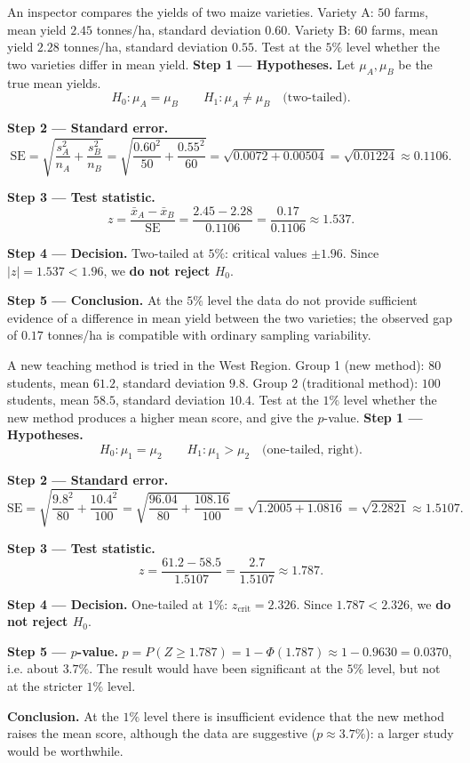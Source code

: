 \documentclass[11pt]{article}
\begin{document}
\begin{exoresolu}
An inspector compares the yields of two maize varieties. Variety A: $50$ farms, mean yield $2.45$ tonnes/ha, standard deviation $0.60$. Variety B: $60$ farms, mean yield $2.28$ tonnes/ha, standard deviation $0.55$. Test at the $5\%$ level whether the two varieties differ in mean yield.
\tcblower
\textbf{Step 1 --- Hypotheses.} Let $\mu_A, \mu_B$ be the true mean yields.
\[ H_0 : \mu_A = \mu_B \qquad H_1 : \mu_A \neq \mu_B \quad \text{(two-tailed)}. \]

\textbf{Step 2 --- Standard error.}
\[ \mathrm{SE} = \sqrt{\frac{s_A^2}{n_A} + \frac{s_B^2}{n_B}} = \sqrt{\frac{0.60^2}{50} + \frac{0.55^2}{60}} = \sqrt{0.0072 + 0.00504} = \sqrt{0.01224} \approx 0.1106. \]

\textbf{Step 3 --- Test statistic.}
\[ z = \frac{\bar{x}_A - \bar{x}_B}{\mathrm{SE}} = \frac{2.45 - 2.28}{0.1106} = \frac{0.17}{0.1106} \approx 1.537. \]

\textbf{Step 4 --- Decision.} Two-tailed at $5\%$: critical values $\pm 1.96$. Since $|z| = 1.537 < 1.96$, we \textbf{do not reject $H_0$}.

\textbf{Step 5 --- Conclusion.} At the $5\%$ level the data do not provide sufficient evidence of a difference in mean yield between the two varieties; the observed gap of $0.17$ tonnes/ha is compatible with ordinary sampling variability.
\end{exoresolu}

\begin{exoresolu}
A new teaching method is tried in the West Region. Group 1 (new method): $80$ students, mean $61.2$, standard deviation $9.8$. Group 2 (traditional method): $100$ students, mean $58.5$, standard deviation $10.4$. Test at the $1\%$ level whether the new method produces a higher mean score, and give the $p$-value.
\tcblower
\textbf{Step 1 --- Hypotheses.}
\[ H_0 : \mu_1 = \mu_2 \qquad H_1 : \mu_1 > \mu_2 \quad \text{(one-tailed, right)}. \]

\textbf{Step 2 --- Standard error.}
\[ \mathrm{SE} = \sqrt{\frac{9.8^2}{80} + \frac{10.4^2}{100}} = \sqrt{\frac{96.04}{80} + \frac{108.16}{100}} = \sqrt{1.2005 + 1.0816} = \sqrt{2.2821} \approx 1.5107. \]

\textbf{Step 3 --- Test statistic.}
\[ z = \frac{61.2 - 58.5}{1.5107} = \frac{2.7}{1.5107} \approx 1.787. \]

\textbf{Step 4 --- Decision.} One-tailed at $1\%$: $z_{\text{crit}} = 2.326$. Since $1.787 < 2.326$, we \textbf{do not reject $H_0$}.

\textbf{Step 5 --- $p$-value.} $p = P(Z \ge 1.787) = 1 - \Phi(1.787) \approx 1 - 0.9630 = 0.0370$, i.e. about $3.7\%$. The result would have been significant at the $5\%$ level, but not at the stricter $1\%$ level.

\textbf{Conclusion.} At the $1\%$ level there is insufficient evidence that the new method raises the mean score, although the data are suggestive ($p \approx 3.7\%$): a larger study would be worthwhile.
\end{exoresolu}
\end{document}
